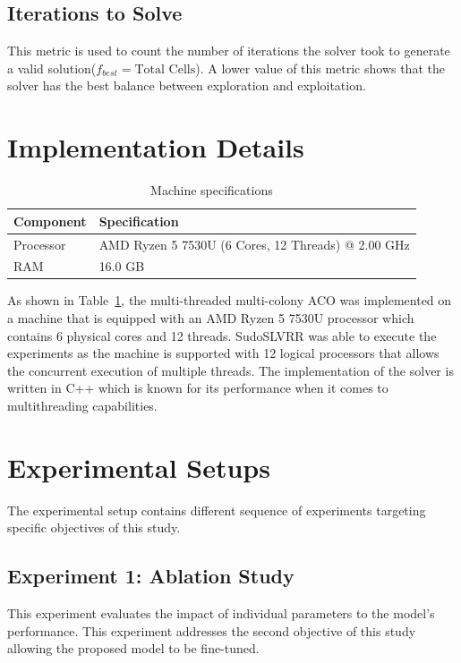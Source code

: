 \subsection*{Iterations to Solve}

        This metric is used to count the number of iterations the solver took to generate a valid solution($f_{best} = \text{Total Cells}$). A lower value of this metric shows that the solver has the best balance between exploration and exploitation. 

\section{Implementation Details}

\begin{table}[H]
    \caption{Machine specifications}
    \centering
    \renewcommand{\arraystretch}{1.2} 
    \setlength{\tabcolsep}{10pt} 
    \begin{tabular}{|l|l|}
    \hline
    \textbf{Component}          & \textbf{Specification}                                \\ \hline
    Processor                   & AMD Ryzen 5 7530U (6 Cores, 12 Threads) @ 2.00 GHz    \\ \hline
    RAM                         & 16.0 GB                                               \\ \hline
    \end{tabular}
    \label{tab:machine_specifications}
\end{table}

As shown in Table~\ref{tab:machine_specifications}, the multi-threaded multi-colony ACO was implemented on a machine that is equipped with an AMD Ryzen 5 7530U processor which contains 6 physical cores and 12 threads. SudoSLVRR was able to execute the experiments as the machine is supported with 12 logical processors that allows the concurrent execution of multiple threads. The implementation of the solver is written in C++ which is known for its performance when it comes to multithreading capabilities. 

\section{Experimental Setups}
The experimental setup contains different sequence of experiments targeting specific objectives of this study. 


\subsection{Experiment 1: Ablation Study}
        This experiment evaluates the impact of individual parameters to the model's performance. This experiment addresses the second objective of this study allowing the proposed model to be fine-tuned. 

